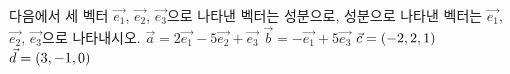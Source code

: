다음에서 세 벡터 $\vec{e_1}$, $\vec{e_2}$, $\vec{e_3}$으로 나타낸 벡터는 성분으로, 성분으로 나타낸 벡터는 $\vec{e_1}$, $\vec{e_2}$, $\vec{e_3}$으로 나타내시오. 
 $\vec{a}=2\vec{e_1}-5\vec{e_2}+\vec{e_3}$
 $\vec{b}=-\vec{e_1}+5\vec{e_3}$
 $\vec{c}=(-2{,}\mkern3mu\mathopen{}2{,}\mkern3mu\mathopen{}1)$
 $\vec{d}=(3{,}\mkern3mu\mathopen{}-1{,}\mkern3mu\mathopen{}0)$
